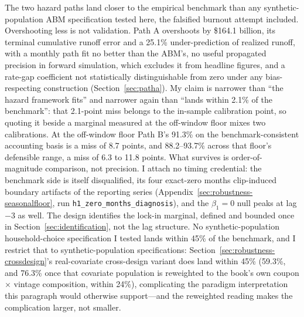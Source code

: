 The two hazard paths land closer to the empirical benchmark than any synthetic-population ABM specification tested here, the falsified burnout attempt included. Overshooting less is not validation. Path A overshoots by \$164.1 billion, its terminal cumulative runoff error and a 25.1\% under-prediction of realized runoff, with a monthly path fit no better than the ABM's, no useful propagated precision in forward simulation, which excludes it from headline figures, and a rate-gap coefficient not statistically distinguishable from zero under any bias-respecting construction (Section~\ref{sec:patha}). My claim is narrower than ``the hazard framework fits'' and narrower again than ``lands within 2.1\% of the benchmark'': that 2.1-point miss belongs to the in-sample calibration point, so quoting it beside a marginal measured at the off-window floor mixes two calibrations. At the off-window floor Path B's 91.3\% on the benchmark-consistent accounting basis is a miss of 8.7 points, and 88.2--93.7\% across that floor's defensible range, a miss of 6.3 to 11.8 points. What survives is order-of-magnitude comparison, not precision. I attach no timing credential: the benchmark side is itself disqualified, its four exact-zero months clip-induced boundary artifacts of the reporting series (Appendix~\ref{sec:robustness-seasonalfloor}, run \texttt{h1\_zero\_months\_diagnosis}), and the $\beta_1 = 0$ null peaks at lag $-3$ as well. The design identifies the lock-in marginal, defined and bounded once in Section~\ref{sec:identification}, not the lag structure. No synthetic-population household-choice specification I tested lands within 45\% of the benchmark, and I restrict that to synthetic-population specifications: Section~\ref{sec:robustness-crossdesign}'s real-covariate cross-design variant does land within 45\% (59.3\%, and 76.3\% once that covariate population is reweighted to the book's own coupon $\times$ vintage composition, within 24\%), complicating the paradigm interpretation this paragraph would otherwise support---and the reweighted reading makes the complication larger, not smaller.


